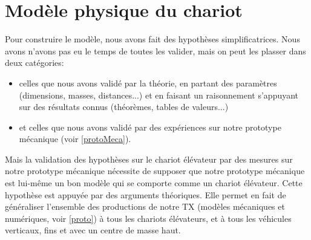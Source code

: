 \section{Modèle physique du chariot}
\label{meca}
Pour construire le modèle, nous avons fait des hypothèses simplificatrices. Nous avons n'avons pas eu le temps de toutes les valider, mais on peut les plasser dans deux catégories:
\begin{itemize}
	\item celles que nous avons validé par la théorie, en partant des paramètres (dimensions, masses, distances...) et en faisant un raisonnement s'appuyant sur des résultats connus (théorèmes, tables de valeurs...)
	\item et celles que nous avons validé par des expériences sur notre prototype mécanique (voir \ref{protoMeca}).
\end{itemize}
Mais la validation des hypothèses sur le chariot élévateur par des mesures sur notre prototype mécanique nécessite de supposer que notre prototype mécanique est lui-même un bon modèle qui se comporte comme un chariot élévateur. Cette hypothèse est appuyée par des arguments théoriques. Elle permet en fait de généraliser l'ensemble des productions de notre TX (modèles mécaniques et numériques, voir \ref{proto}) à tous les chariots élévateurs, et à tous les véhicules verticaux, fins et avec un centre de masse haut.
